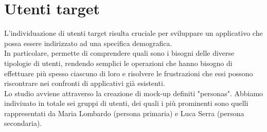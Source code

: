     \section{Utenti target}
        L'individuazione di utenti target risulta cruciale per sviluppare un applicativo che possa essere indirizzato ad una specifica demografica. \\
        In particolare, permette di comprendere quali sono i bisogni delle diverse tipologie di utenti, rendendo semplici le operazioni che hanno bisogno di effettuare più spesso ciascuno di loro e risolvere le frustrazioni che essi possono riscontrare nei confronti di applicativi già esistenti. \\
        Lo studio avviene attraverso la creazione di mock-up definiti "personas". Abbiamo indiviuato in totale sei gruppi di utenti, dei quali i più prominenti sono quelli rappresentati da Maria Lombardo (persona primaria) e Luca Serra (persona secondaria).
        
